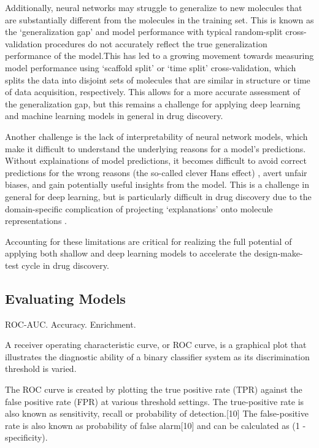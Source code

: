 Additionally, neural networks may struggle to generalize to new molecules that are substantially different from the molecules in the training set. This is known as the `generalization gap' and model performance with typical random-split cross-validation procedures do not accurately reflect the true generalization performance of the model.This has led to a growing movement towards measuring model performance using `scaffold split' or `time split' cross-validation, which splits the data into disjoint sets of molecules that are similar in structure or time of data acquisition, respectively. This allows for a more accurate assessment of the generalization gap, but this remains a challenge for applying deep learning and machine learning models in general in drug discovery.

Another challenge is the lack of interpretability of neural network models, which make it difficult to understand the underlying reasons for a model's predictions. Without explainations of model predictions, it becomes difficult to avoid correct predictions for the wrong reasons (the so-called clever Hans effect) \cite{Lapuschkin2019UnmaskingCleverHans}, avert unfair biases, and gain potentially useful insights from the model. This is a challenge in general for deep learning, but is particularly difficult in drug discovery due to the domain-specific complication of projecting `explanations' onto molecule representations \cite{Jimenze2020XAI}.

Accounting for these limitations are critical for realizing the full potential of applying both shallow and deep learning models to accelerate the design-make-test cycle in drug discovery.

\subsection{Evaluating Models}

ROC-AUC. Accuracy. Enrichment.

A receiver operating characteristic curve, or ROC curve, is a graphical plot that illustrates the diagnostic ability of a binary classifier system as its discrimination threshold is varied.

The ROC curve is created by plotting the true positive rate (TPR) against the false positive rate (FPR) at various threshold settings. The true-positive rate is also known as sensitivity, recall or probability of detection.[10] The false-positive rate is also known as probability of false alarm[10] and can be calculated as (1 - specificity).

